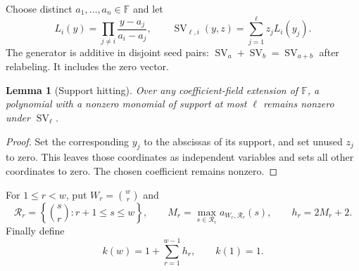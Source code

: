 \documentclass[11pt]{article}
\newtheorem{lemma}[theorem]{Lemma}
\theoremstyle{definition}\newtheorem{definition}[theorem]{Definition}
\theoremstyle{remark}\newtheorem{remark}[theorem]{Remark}
\newcommand{\F}{\mathbb F}
\newcommand{\SV}{\operatorname{SV}}
\begin{document}
Choose distinct $a_1,\ldots,a_n\in\F$ and let
\[
 L_i(y)=\prod_{j\ne i}\frac{y-a_j}{a_i-a_j},\qquad
 \SV_{\ell,i}(y,z)=\sum_{j=1}^{\ell}z_jL_i(y_j).
\]
The generator is additive in disjoint seed pairs:
$\SV_a+\SV_b=\SV_{a+b}$ after relabeling. It includes the zero vector.

\begin{lemma}[Support hitting]\label{lem:sv}
Over any coefficient-field extension of $\F$, a polynomial with a nonzero
monomial of support at most $\ell$ remains nonzero under $\SV_\ell$.
\end{lemma}
\begin{proof}
Set the corresponding $y_j$ to the abscissas of its support, and set unused
$z_j$ to zero. This leaves those coordinates as independent variables and
sets all other coordinates to zero. The chosen coefficient remains nonzero.
\end{proof}

For $1\le r<w$, put $W_r=\binom wr$ and
\[
 \mathcal R_r=\left\{\binom sr:r+1\le s\le w\right\},\qquad
 M_r=\max_{s\in\mathcal R_r}a_{W_r,\mathcal R_r}(s),\qquad
 h_r=2M_r+2.
\]
Finally define
\begin{equation}\label{eq:k}
 k(w)=1+\sum_{r=1}^{w-1}h_r,\qquad k(1)=1.
\end{equation}
\end{document}

